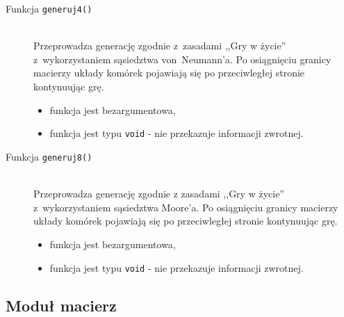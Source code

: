 \documentclass[a4paper,12pt,oneside]{article}
\begin{document}
\begin{description}
\item[Funkcja \texttt{generuj4()}] \hfill \\
Przeprowadza generację zgodnie z~zasadami ,,Gry w życie'' z~wykorzystaniem sąsiedztwa von~Neumann'a. Po osiągnięciu granicy macierzy układy komórek pojawiają się po przeciwległej stronie kontynuując grę.
\begin{itemize}
\item funkcja jest bezargumentowa,
\item funkcja jest typu \verb+void+ - nie przekazuje informacji zwrotnej.
\end{itemize}
\item [Funkcja \texttt{generuj8()}] \hfill \\
Przeprowadza generację zgodnie z zasadami ,,Gry w życie'' z~wykorzystaniem sąsiedztwa Moore'a. Po osiągnięciu granicy macierzy układy komórek pojawiają się po przeciwległej stronie kontynuując grę.

\begin{itemize}
\item funkcja jest bezargumentowa,
\item funkcja jest typu \verb+void+ - nie przekazuje informacji zwrotnej.
\end{itemize}
\end{description}

\subsection{Moduł macierz}
\end{document}
